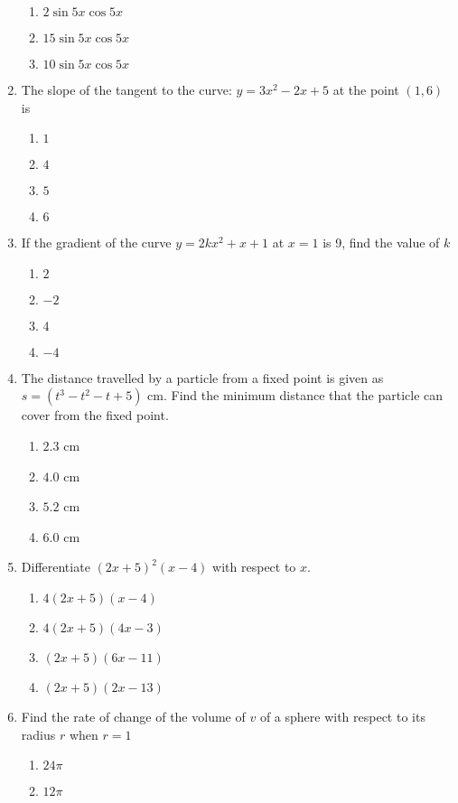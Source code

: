 \begin{multicols}{2}
\begin{enumerate}[label={\arabic*.}]
\begin{enumerate}[label={\Alph*.}]
\item \(2 \sin{5x\cos{5x}}\)
\item \(15 \sin{5x\cos{5x}}\)
\item \(10 \sin{5x\cos{5x}}\)
\end{enumerate}
\item The slope of the tangent to the curve: \(y = 3{x}^{2}-2x+5\) at the point \((1,6)\) is
\begin{enumerate}[label={\Alph*.}]
\item \(1\)
\item \(4\)
\item \(5\)
\item \(6\)
\end{enumerate}
\item If the gradient of the curve \(y = 2k{x}^{2} + x + 1\) at \(x = 1\) is 9, find the value of \(k\)
\begin{enumerate}[label={\Alph*.}]
\item \(2\)
\item \(-2\)
\item \(4\)
\item \(-4\)
\end{enumerate}
\item The distance travelled by a particle from a fixed point is given as \(s = \left({t}^{3} - {t}^{2} - t + 5\right)\) cm. Find the minimum distance that the particle can cover from the fixed point.
\begin{enumerate}[label={\Alph*.}]
\item \(2.3\) cm
\item \(4.0\) cm
\item \(5.2\) cm
\item \(6.0\) cm
\end{enumerate}
\item Differentiate \((2x+5)^{2}(x-4)\) with respect to \(x\).
\begin{enumerate}[label={\Alph*.}]
\item \(4(2x+5)(x-4)\)
\item \(4(2x+5)(4x-3)\)
\item \((2x+5)(6x-11)\)
\item \((2x+5)(2x-13)\)
\end{enumerate}
\item Find the rate of change of the volume of \(v\) of a sphere with respect to its radius \(r\) when \(r = 1\)
\begin{enumerate}[label={\Alph*.}]
\item \(24\pi\)
\item \(12\pi\)

\end{enumerate}
\end{enumerate}
\end{multicols}
